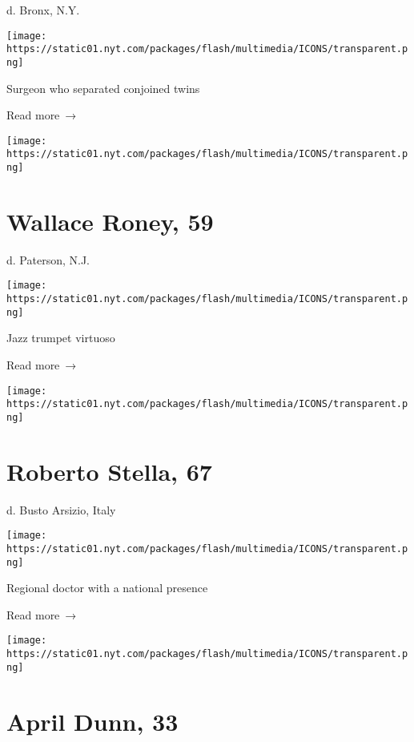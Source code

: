 d. Bronx, N.Y.

\texttt{[image: https://static01.nyt.com/packages/flash/multimedia/ICONS/transparent.png]}

Surgeon who separated conjoined twins

 Read more~→

\href{https://www.nytimes.com/2020/03/31/arts/music/wallace-roney-dead-coronavirus.html}{}

\texttt{[image: https://static01.nyt.com/packages/flash/multimedia/ICONS/transparent.png]}

\hypertarget{wallace-roney-59}{%
\section{Wallace Roney, 59}\label{wallace-roney-59}}

d. Paterson, N.J.

\texttt{[image: https://static01.nyt.com/packages/flash/multimedia/ICONS/transparent.png]}

Jazz trumpet virtuoso

 Read more~→

\href{https://www.nytimes.com/2020/03/31/obituaries/roberto-stella-dead-coronavirus.html}{}

\texttt{[image: https://static01.nyt.com/packages/flash/multimedia/ICONS/transparent.png]}

\hypertarget{roberto-stella-67}{%
\section{Roberto Stella, 67}\label{roberto-stella-67}}

d. Busto Arsizio, Italy

\texttt{[image: https://static01.nyt.com/packages/flash/multimedia/ICONS/transparent.png]}

Regional doctor with a national presence

 Read more~→

\href{https://www.nytimes.com/2020/03/31/obituaries/april-dunn-dead-coronavirus.html}{}

\texttt{[image: https://static01.nyt.com/packages/flash/multimedia/ICONS/transparent.png]}

\hypertarget{april-dunn-33}{%
\section{April Dunn, 33}\label{april-dunn-33}}

